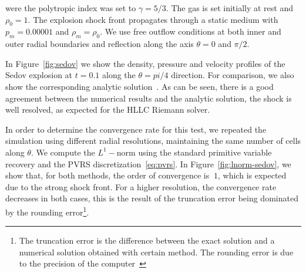\noindent were the polytropic index was set to $\gamma = 5/3$. The gas is set initially at rest and $\rho_0 = 1$. The explosion shock front propagates through a static medium with $p_m = 0.00001$ and $\rho_m = \rho_0$. We use free outflow conditions at both inner and outer radial boundaries and reflection along the axis $\theta = 0$ and $\pi/2$.

In Figure~\ref{fig:sedov} we show the density, pressure and velocity profiles of the Sedov explosion at $t=0.1$ along the $\theta = pi/4$ direction. For comparison, we also show the corresponding analytic solution~\citet{kamm2000}. As can be seen, there is a good agreement between the numerical results and the analytic solution, the shock is well resolved, as expected for the HLLC Riemann solver.

In order to determine the convergence rate for this test, we repeated the simulation using different radial resolutions, maintaining the same number of cells along $\theta$. We compute the $L^1-$norm using the standard primitive variable recovery and the PVRS discretization~\eqref{eq:pvrs}. In Figure~\ref{fig:lnorm-sedov}, we show that, for both methods, the order of convergence is $~1$, which is expected due to the strong shock front. For a higher resolution, the convergence rate decreases in both cases, this is the result of the truncation error being dominated by the rounding error\footnote{The truncation error is the difference between the exact solution and a numerical solution obtained with certain method. The rounding error is due to the precision of the computer~\citep[][]{leveque2002}}.



